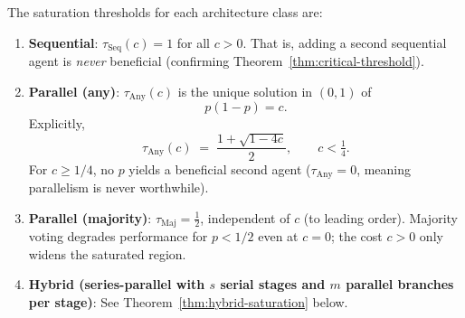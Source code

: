 \begin{theorem}
\label{thm:saturation-thresholds}
The saturation thresholds for each architecture class are:
\begin{enumerate}
  \item \textbf{Sequential}: $\tau_{\mathrm{Seq}}(c) = 1$ for all $c > 0$.
  That is, adding a second sequential agent is \emph{never} beneficial
  (confirming Theorem~\ref{thm:critical-threshold}).

  \item \textbf{Parallel (any)}: $\tau_{\mathrm{Any}}(c)$ is the unique solution
  in $(0,1)$ of
  \begin{equation}
    \label{eq:tau-any}
    p(1-p) = c.
  \end{equation}
  Explicitly,
  \[
    \tau_{\mathrm{Any}}(c) \;=\; \frac{1 + \sqrt{1 - 4c}}{2},
    \qquad c < \tfrac{1}{4}.
  \]
  For $c \geq 1/4$, no $p$ yields a beneficial second agent
  ($\tau_{\mathrm{Any}} = 0$, meaning parallelism is never worthwhile).

  \item \textbf{Parallel (majority)}: $\tau_{\mathrm{Maj}} = \frac{1}{2}$,
  independent of $c$ (to leading order). Majority voting degrades performance
  for $p < 1/2$ even at $c = 0$; the cost $c > 0$ only widens the saturated region.

  \item \textbf{Hybrid (series-parallel with $s$ serial stages and $m$ parallel
  branches per stage)}: See Theorem~\ref{thm:hybrid-saturation} below.
\end{enumerate}
\end{theorem}

